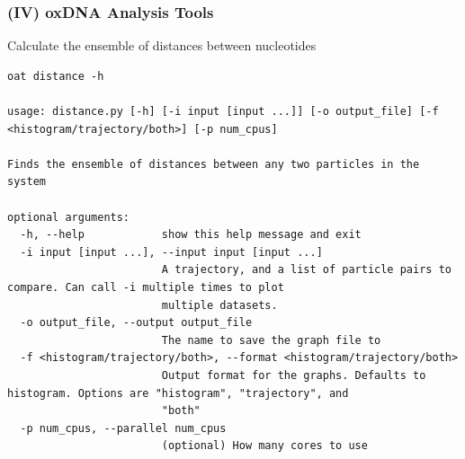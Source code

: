 \documentclass[slidestop,compress,9pt]{beamer}
\begin{document}
\begin{frame}[fragile]
\frametitle{(IV) oxDNA Analysis Tools}

Calculate the ensemble of distances between nucleotides

\begin{lstlisting} 
oat distance -h

usage: distance.py [-h] [-i input [input ...]] [-o output_file] [-f <histogram/trajectory/both>] [-p num_cpus]

Finds the ensemble of distances between any two particles in the system

optional arguments:
  -h, --help            show this help message and exit
  -i input [input ...], --input input [input ...]
                        A trajectory, and a list of particle pairs to compare. Can call -i multiple times to plot
                        multiple datasets.
  -o output_file, --output output_file
                        The name to save the graph file to
  -f <histogram/trajectory/both>, --format <histogram/trajectory/both>
                        Output format for the graphs. Defaults to histogram. Options are "histogram", "trajectory", and
                        "both"
  -p num_cpus, --parallel num_cpus
                        (optional) How many cores to use
\end{lstlisting}


\end{frame}
\end{document}
